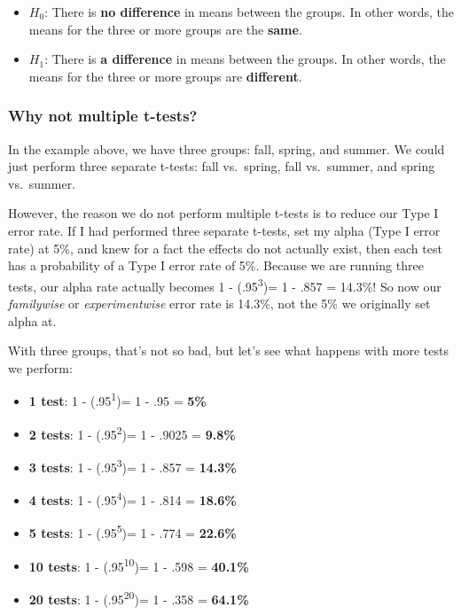\documentclass[
]{book}
\providecommand{\tightlist}{%
  \setlength{\itemsep}{0pt}\setlength{\parskip}{0pt}}
\begin{document}
\begin{itemize}
\tightlist
\item
  \(H_0\): There is \textbf{no difference} in means between the groups. In other words, the means for the three or more groups are the \textbf{same}.
\item
  \(H_1\): There is \textbf{a difference} in means between the groups. In other words, the means for the three or more groups are \textbf{different}.
\end{itemize}

\hypertarget{why-not-multiple-t-tests}{%
\subsubsection{Why not multiple t-tests?}\label{why-not-multiple-t-tests}}

In the example above, we have three groups: fall, spring, and summer. We could just perform three separate t-tests: fall vs.~spring, fall vs.~summer, and spring vs.~summer.

However, the reason we do not perform multiple t-tests is to reduce our Type I error rate. If I had performed three separate t-tests, set my alpha (Type I error rate) at 5\%, and knew for a fact the effects do not actually exist, then each test has a probability of a Type I error rate of 5\%. Because we are running three tests, our alpha rate actually becomes 1 - (.95\textsuperscript{3})= 1 - .857 = 14.3\%! So now our \emph{familywise} or \emph{experimentwise} error rate is 14.3\%, not the 5\% we originally set alpha at.

With three groups, that's not so bad, but let's see what happens with more tests we perform:

\begin{itemize}
\tightlist
\item
  \textbf{1 test}: 1 - (.95\textsuperscript{1})= 1 - .95 = \textbf{5\%}
\item
  \textbf{2 tests}: 1 - (.95\textsuperscript{2})= 1 - .9025 = \textbf{9.8\%}
\item
  \textbf{3 tests}: 1 - (.95\textsuperscript{3})= 1 - .857 = \textbf{14.3\%}
\item
  \textbf{4 tests}: 1 - (.95\textsuperscript{4})= 1 - .814 = \textbf{18.6\%}
\item
  \textbf{5 tests}: 1 - (.95\textsuperscript{5})= 1 - .774 = \textbf{22.6\%}
\item
  \textbf{10 tests}: 1 - (.95\textsuperscript{10})= 1 - .598 = \textbf{40.1\%}
\item
  \textbf{20 tests}: 1 - (.95\textsuperscript{20})= 1 - .358 = \textbf{64.1\%}
\end{itemize}
\end{document}
